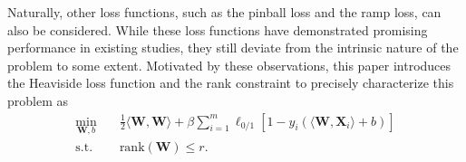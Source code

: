\documentclass[sn-mathphys]{JORSC-jnl}%
\theoremstyle{thmstyleone}%
\theoremstyle{thmstylethree}%
\theoremstyle{thmstyleone} %
\begin{document}
Naturally, other loss functions, such as the pinball loss and the ramp loss, can also be considered. While these loss functions have demonstrated promising performance in existing studies, they still deviate from the intrinsic nature of the problem to some extent. Motivated by these observations, this paper introduces the Heaviside loss function and the rank constraint to precisely characterize this problem as 
\begin{equation}\label{RSMM-1}
	\begin{aligned}
		\min\limits_{\mathbf W,b}\quad
		&\frac{1}{2}\langle\mathbf W,\mathbf W\rangle+\beta\sum\limits_{i=1}^m  \ell_{0/1}\left[1-y_i(\langle \mathbf W,\mathbf X_i\rangle+b)\right]\\
		\text{s.t.} \quad & \text{rank}(\mathbf{W}) \leq r.
	\end{aligned}
\end{equation}
\end{document}
